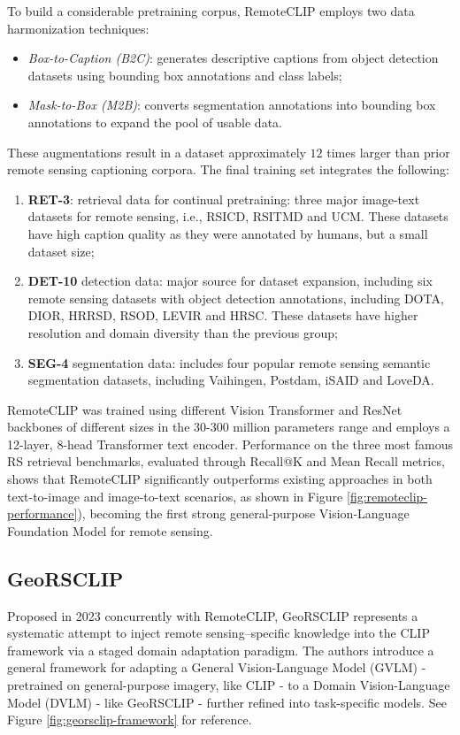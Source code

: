 \documentclass[a4paper, twoside, english]{sapthesis} %
\begin{document}
To build a considerable pretraining corpus, RemoteCLIP employs two data harmonization techniques:

\begin{itemize}
    \item \emph{Box-to-Caption (B2C)}: generates descriptive captions from object detection datasets using bounding box annotations and class labels;
    \item \emph{Mask-to-Box (M2B)}: converts segmentation annotations into bounding box annotations to expand the pool of usable data.
\end{itemize}
These augmentations result in a dataset approximately $12$ times larger than prior remote sensing captioning corpora. The final training set integrates the following:
\begin{enumerate}
    \item \textbf{RET-3}: retrieval data for continual pretraining: three major image-text datasets for remote sensing, i.e., RSICD, RSITMD and UCM. These datasets have high caption quality as they were annotated by humans, but a small dataset size;
    \item \textbf{DET-10} detection data: major source for dataset expansion, including six remote sensing datasets with object detection annotations, including DOTA, DIOR, HRRSD, RSOD, LEVIR and HRSC. These datasets have higher resolution and domain diversity than the previous group;
    \item \textbf{SEG-4} segmentation data: includes four popular remote sensing semantic segmentation datasets, including Vaihingen, Postdam, iSAID and LoveDA.
\end{enumerate}

RemoteCLIP was trained using different Vision Transformer and ResNet backbones of different sizes in the 30-300 million parameters range and employs a 12-layer, 8-head Transformer text encoder. Performance on the three most famous RS retrieval benchmarks, evaluated through Recall@K and Mean Recall metrics, shows that RemoteCLIP significantly outperforms existing approaches in both text-to-image and image-to-text scenarios, as shown in Figure \ref{fig:remoteclip-performance}), becoming the first strong general-purpose Vision-Language Foundation Model for remote sensing.

\subsection{GeoRSCLIP}

Proposed in 2023 concurrently with RemoteCLIP, GeoRSCLIP \cite{zhang2024rs5m} represents a systematic attempt to inject remote sensing–specific knowledge into the CLIP framework via a staged domain adaptation paradigm. The authors introduce a general framework for adapting a General Vision-Language Model (GVLM) - pretrained on general-purpose imagery, like CLIP - to a Domain Vision-Language Model (DVLM) - like GeoRSCLIP - further refined into task-specific models. See Figure \ref{fig:georsclip-framework} for reference.
\end{document}

